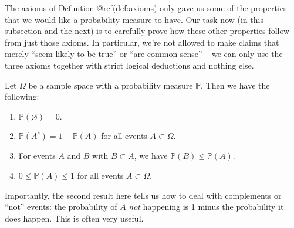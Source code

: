 \documentclass[
  letterpaper,
]{report}
\providecommand{\tightlist}{%
  \setlength{\itemsep}{0pt}\setlength{\parskip}{0pt}}\usepackage{longtable,booktabs,array}
\theoremstyle{definition}
\theoremstyle{definition}
\theoremstyle{remark}
\begin{document}
The axioms of Definition @ref(def:axioms) only gave us some of the
properties that we would like a probability measure to have. Our task
now (in this subsection and the next) is to carefully prove how these
other properties follow from just those axioms. In particular, we're not
allowed to make claims that merely ``seem likely to be true'' or ``are
common sense'' -- we can only use the three axioms together with strict
logical deductions and nothing else.

Let \(\Omega\) be a sample space with a probability measure
\(\mathbb P\). Then we have the following:

\begin{enumerate}
\def\labelenumi{\arabic{enumi}.}
\tightlist
\item
  \(\mathbb P(\varnothing) = 0\).
\item
  \(\mathbb P(A^\mathsf{c}) = 1 - \mathbb P(A)\) for all events
  \(A \subset \Omega\).
\item
  For events \(A\) and \(B\) with \(B \subset A\), we have
  \(\mathbb P(B) \leq \mathbb P(A)\).
\item
  \(0 \leq \mathbb P(A) \leq 1\) for all events \(A \subset \Omega\).
\end{enumerate}

Importantly, the second result here tells us how to deal with
complements or ``not'' events: the probability of \(A\) \emph{not}
happening is 1 minus the probability it does happen. This is often very
useful.
\end{document}
